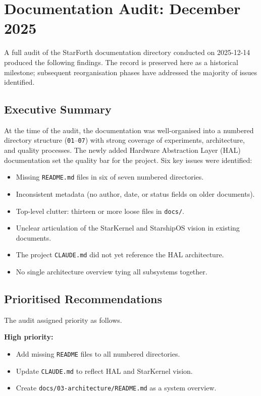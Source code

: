 
\section{Documentation Audit: December 2025}

A full audit of the StarForth documentation directory conducted on 2025-12-14
produced the following findings. The record is preserved here as a historical
milestone; subsequent reorganisation phases have addressed the majority of
issues identified.

\subsection{Executive Summary}

At the time of the audit, the documentation was well-organised into a
numbered directory structure (\texttt{01}--\texttt{07}) with strong coverage
of experiments, architecture, and quality processes. The newly added Hardware
Abstraction Layer (HAL) documentation set the quality bar for the project.
Six key issues were identified:

\begin{itemize}
  \item Missing \texttt{README.md} files in six of seven numbered directories.
  \item Inconsistent metadata (no author, date, or status fields on older documents).
  \item Top-level clutter: thirteen or more loose files in \texttt{docs/}.
  \item Unclear articulation of the StarKernel and StarshipOS vision in existing documents.
  \item The project \texttt{CLAUDE.md} did not yet reference the HAL architecture.
  \item No single architecture overview tying all subsystems together.
\end{itemize}

\subsection{Prioritised Recommendations}

The audit assigned priority as follows.

\textbf{High priority:}
\begin{itemize}
  \item Add missing \texttt{README} files to all numbered directories.
  \item Update \texttt{CLAUDE.md} to reflect HAL and StarKernel vision.
  \item Create \texttt{docs/03-architecture/README.md} as a system overview.
\end{itemize}

